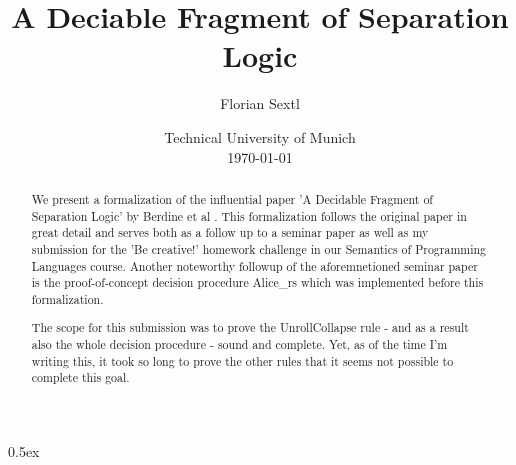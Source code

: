\documentclass[11pt,a4paper]{article}
\begin{document}
\title{A Deciable Fragment of Separation Logic}
\author{Florian Sextl}
\date{Technical University of Munich\\[\baselineskip] \today}
\maketitle

\begin{abstract}
  We present a formalization of the influential paper 'A Decidable Fragment of
  Separation Logic' by Berdine et al \cite{JoshBerdine.2004}.
  This formalization follows the original paper in great detail and serves both
  as a follow up to a seminar paper \cite{seminar-paper} as well as my submission
  for the 'Be creative!' homework challenge in our Semantics of Programming Languages course.
  Another noteworthy followup of the aforemnetioned seminar paper is the proof-of-concept
  decision procedure Alice\_rs \cite{Alice-rs} which was implemented before this formalization.

  The scope for this submission was to prove the UnrollCollapse rule - and as a result also the whole
  decision procedure - sound and complete. Yet, as of the time I'm writing this, it took so long to 
  prove the other rules that it seems not possible to complete this goal.
\end{abstract}

\tableofcontents

\pagebreak

\parindent 0pt\parskip 0.5ex



%


\end{document}
